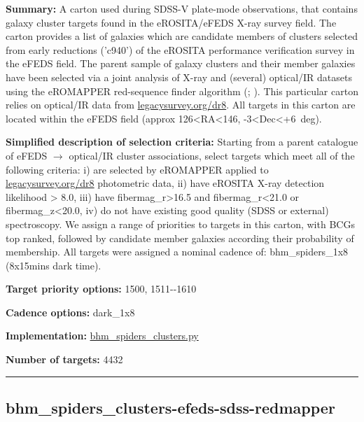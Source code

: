 \noindent\textbf{Summary:} A carton used during SDSS-V plate-mode observations,
that contains galaxy cluster targets found in the eROSITA/eFEDS X-ray
survey field. The carton provides a list of galaxies which are candidate
members of clusters selected from early reductions ('c940') of the
eROSITA performance verification survey in the eFEDS field. The parent
sample of galaxy clusters and their member galaxies have been selected
via a joint analysis of X-ray and (several) optical/IR datasets using
the eROMAPPER red-sequence finder algorithm
(\citealt{Rykoff2014};
\citealt{IderChitham2020}). This particular carton relies on optical/IR data
from \href{https://www.legacysurvey.org/dr8/}{legacysurvey.org/dr8}. All
targets in this carton are located within the eFEDS field (approx
126\textless RA\textless146, -3\textless Dec\textless+6~deg).

\noindent\textbf{Simplified description of selection criteria:} Starting from a
parent catalogue of eFEDS $\rightarrow$ optical/IR cluster associations, select
targets which meet all of the following criteria: i) are selected by
eROMAPPER applied to
\href{https://www.legacysurvey.org/dr8}{legacysurvey.org/dr8}
photometric data, ii) have eROSITA X-ray detection likelihood
\textgreater{} 8.0, iii) have fibermag\_r\textgreater16.5 and
fibermag\_r\textless21.0 or fibermag\_z\textless20.0, iv) do not have
existing good quality (SDSS or external) spectroscopy. We assign a range
of priorities to targets in this carton, with BCGs top ranked, followed
by candidate member galaxies according their probability of membership.
All targets were assigned a nominal cadence of: bhm\_spiders\_1x8
(8x15mins dark time).


\noindent\textbf{Target priority options:} 1500, 1511-\/-1610

\noindent\textbf{Cadence options:} dark\_1x8

\noindent\textbf{Implementation:}
\href{https://github.com/sdss/target_selection/blob/0.1.0/python/target_selection/cartons/bhm_spiders_clusters.py}{bhm\_spiders\_clusters.py}

\noindent\textbf{Number of targets:} 4432

\begin{center}\rule{0.5\linewidth}{0.5pt}\end{center}

\hypertarget{bhm_spiders_clusters-efeds-sdss-redmapper_plan0.1.0}{%
\subsection{bhm\_spiders\_clusters-efeds-sdss-redmapper}\label{bhm_spiders_clusters-efeds-sdss-redmapper_plan0.1.0}}

